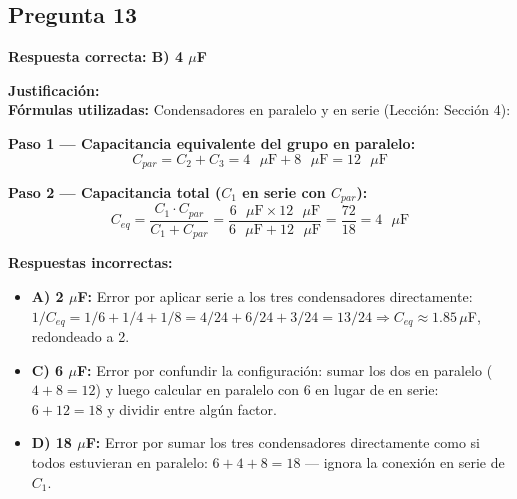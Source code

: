 \begin{respuestabox}
\subsection{Pregunta 13}
\textcolor{verdecorrecto}{\textbf{Respuesta correcta: B) 4 $\mu$F}}

\textbf{Justificación:}\\
\textbf{Fórmulas utilizadas:} Condensadores en paralelo y en serie (Lección: Sección 4):

\textbf{Paso 1 — Capacitancia equivalente del grupo en paralelo:}
$$C_{par} = C_2 + C_3 = 4 \text{ }\mu\text{F} + 8 \text{ }\mu\text{F} = 12 \text{ }\mu\text{F}$$

\textbf{Paso 2 — Capacitancia total ($C_1$ en serie con $C_{par}$):}
$$C_{eq} = \frac{C_1 \cdot C_{par}}{C_1 + C_{par}} = \frac{6 \text{ }\mu\text{F} \times 12 \text{ }\mu\text{F}}{6 \text{ }\mu\text{F} + 12 \text{ }\mu\text{F}} = \frac{72}{18} = 4 \text{ }\mu\text{F}$$

\textbf{Respuestas incorrectas:}
\begin{itemize}
    \item \textbf{A) 2 $\mu$F:} Error por aplicar serie a los tres condensadores directamente: $1/C_{eq} = 1/6+1/4+1/8 = 4/24+6/24+3/24 = 13/24 \Rightarrow C_{eq} \approx 1.85\,\mu$F, redondeado a 2.
    \item \textbf{C) 6 $\mu$F:} Error por confundir la configuración: sumar los dos en paralelo ($4+8=12$) y luego calcular en paralelo con 6 en lugar de en serie: $6+12=18$ y dividir entre algún factor.
    \item \textbf{D) 18 $\mu$F:} Error por sumar los tres condensadores directamente como si todos estuvieran en paralelo: $6+4+8 = 18$ — ignora la conexión en serie de $C_1$.
\end{itemize}
\end{respuestabox}

